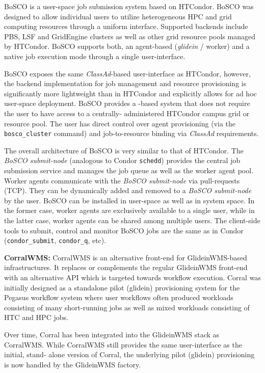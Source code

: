 \documentclass{sig-alternate}
\begin{document}
BoSCO is a user-space job submission system based on HTCondor. BoSCO was
designed to allow individual users to utilize heterogeneous HPC and grid
computing resources through a uniform interface. Supported backends include
PBS, LSF and GridEngine clusters as well as other  grid resource pools managed
by HTCondor. BoSCO supports both, an agent-based (\textit{glidein} / worker)
and a native job execution mode through a single user-interface.

BoSCO exposes the same \textit{ClassAd}-based user-interface as HTCondor,
however, the backend implementation for job management and resource
provisioning is significantly more lightweight than in HTCondor and explicitly
allows for ad hoc user-space deployment. BoSCO provides a \pilotjob-based
system that does not require the user to have access to a centrally-
administered HTCondor campus grid or  resource pool. The user has direct
control over \pilotjob agent provisioning (via the \texttt{bosco\_cluster}
command) and job-to-resource binding via \textit{ClassAd} requirements.

The overall architecture of BoSCO is very similar to that of HTCondor. The
\textit{BoSCO submit-node} (analogous to Condor \texttt{schedd}) provides the
central job submission service and manages the job queue as well as the worker
agent pool. Worker agents communicate with the \textit{BoSCO submit-node} via
pull-requests (TCP). They can be dynamically added and removed to a
\textit{BoSCO submit-node} by the user. BoSCO can be installed in user-space
as well as in system space. In the former case, worker agents are exclusively
available to a single user, while in the latter case, worker agents can be
shared among multiple users. The client-side tools to submit, control and
monitor BoSCO jobs are the same as in Condor (\texttt{condor\_submit},
\texttt{condor\_q}, etc).


\textbf{CorralWMS:} CorralWMS is an alternative front-end for GlideinWMS-based
infrastructures. It replaces or complements the regular GlideinWMS front-end
with an alternative API which is targeted towards workflow execution. Corral was
initially designed as a standalone pilot (glidein) provisioning system for
the Pegasus workflow system where user  workflows often produced workloads
consisting of many short-running jobs as well as mixed workloads consisting of
HTC and HPC jobs.

Over time, Corral has been integrated into the GlideinWMS stack as CorralWMS.
While CorralWMS still provides the same user-interface as the initial, stand-
alone version of Corral, the underlying pilot (glidein) provisioning is
now handled by the GlideinWMS factory.
\end{document}
